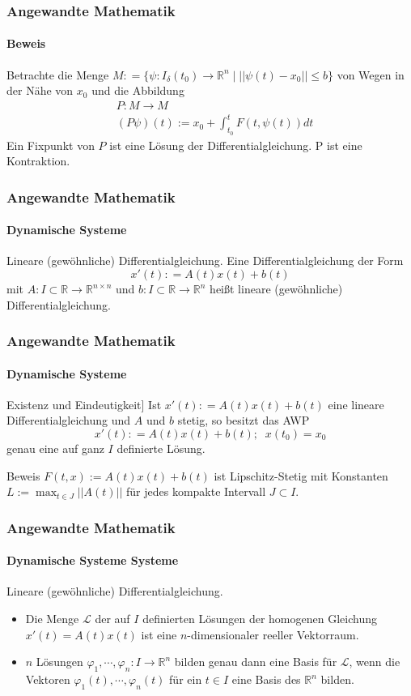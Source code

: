 \documentclass{beamer}
\begin{document}
\begin{frame}
    \frametitle{Angewandte Mathematik}
\framesubtitle{Beweis}
Betrachte die Menge  $M: = \{ \psi : I_\delta (t_0) \to \mathbb{R}^n \; | \; ||\psi(t) - x_0 || \leq b  \}$ von Wegen in der Nähe von $x_0$ und die Abbildung
\begin{align*}
& P : M \to M \\
& (P \psi)(t) := x_0 + \int_{t_0}^{t} F(t, \psi(t)) dt
\end{align*}
Ein Fixpunkt von $P$ ist eine Lösung der Differentialgleichung. P ist eine Kontraktion.
 \end{frame}



\begin{frame}
    \frametitle{Angewandte Mathematik}
\framesubtitle{Dynamische Systeme }
\begin{block}{Lineare (gewöhnliche) Differentialgleichung.}
Eine Differentialgleichung der Form
$$ x' (t): = A(t) x(t) + b(t)$$
mit $A: I \subset \mathbb{R} \to \mathbb{R}^{n \times n}$ und $b: I \subset \mathbb{R} \to \mathbb{R}^{n}$ heißt lineare (gewöhnliche) Differentialgleichung.
\end{block}

 \end{frame}


\begin{frame}
    \frametitle{Angewandte Mathematik}
\framesubtitle{Dynamische Systeme }
\begin{block}{Existenz und Eindeutigkeit]}
Ist $x' (t): = A(t) x(t) + b(t)$ eine lineare Differentialgleichung und $A$ und $b$ stetig, so besitzt das AWP 
$$ x' (t): = A(t) x(t) + b(t) ; \; \; x(t_0) = x_0 $$
genau eine auf ganz $I$ definierte Lösung.
\end{block}
\begin{block}{Beweis}
$F(t,x):= A(t) x(t) + b(t)$ ist Lipschitz-Stetig mit Konstanten $L:= \max_{t \in J}|| A(t) ||$ für jedes kompakte Intervall $J \subset I$.
\end{block}
 \end{frame}


\begin{frame}
    \frametitle{Angewandte Mathematik}
\framesubtitle{Dynamische Systeme Systeme}
\begin{block}{Lineare (gewöhnliche) Differentialgleichung.}
\begin{itemize}
\item Die Menge $\mathcal{L}$ der auf $I$ definierten Lösungen der homogenen Gleichung $x'(t) = A(t)x(t)$ ist eine $n$-dimensionaler reeller Vektorraum.
\item $n$ Lösungen $\varphi_1, \cdots, \varphi_n : I \to \mathbb{R}^n$ bilden genau dann eine Basis für $\mathcal{L}$, wenn die Vektoren $\varphi_1(t), \cdots, \varphi_n(t)$ für ein $t \in I$ eine Basis des $\mathbb{R}^n$ bilden.
\end{itemize}
\end{block}

 \end{frame}
\end{document}

